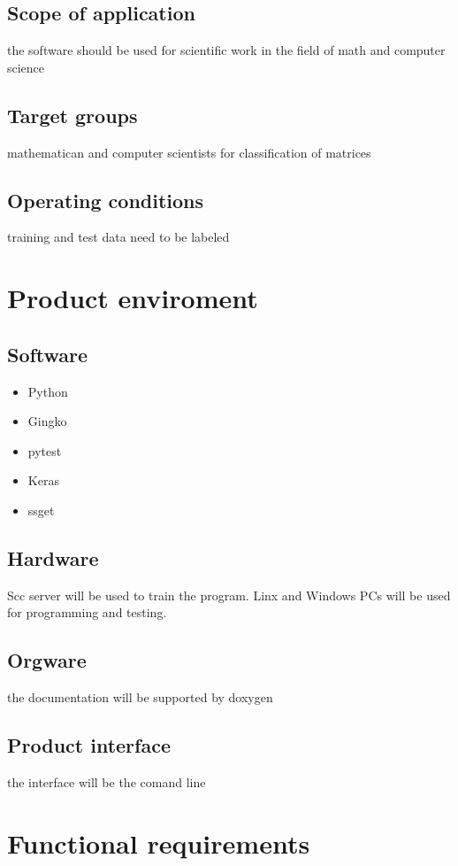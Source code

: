\documentclass[parskip=full]{scrartcl}
\begin{document}
\subsection{Scope of application}
the software should be used for scientific work in the field of math and computer science
\subsection{Target groups}
mathematican and computer scientists for classification of matrices
\subsection{Operating conditions}
training and test data need to be labeled

\section{Product enviroment}
\subsection{Software}
\begin{itemize}
\item Python
\item Gingko
\item pytest
\item Keras
\item ssget
\end{itemize}
\subsection{Hardware}
Scc server will be used to train the program. Linx and Windows PCs will be used for programming and testing.

\subsection{Orgware}
the documentation will be supported by doxygen

\subsection{Product interface}
the interface will be the comand line

\section{Functional requirements}
\end{document}
